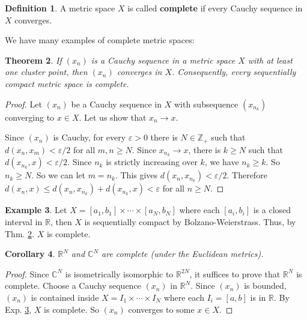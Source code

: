 \documentclass[12pt,b5paper,notitlepage]{article}
\theoremstyle{definition}
\newtheorem{df}{Definition}[section]
\newtheorem{eg}[df]{Example}
\theoremstyle{plain}
\newtheorem{thm}[df]{Theorem}
\newtheorem{co}[df]{Corollary}
\newcommand{\Cbb}{\mathbb C}
\newcommand{\Zbb}{\mathbb Z}
\newcommand{\Rbb}{\mathbb R}
\newcommand{\eps}{\varepsilon}
\numberwithin{equation}{section}
\begin{document}
\begin{df}
A metric space $X$ is called \textbf{complete}  if every Cauchy sequence in $X$ converges.
\end{df}




We have many examples of complete metric spaces:

\begin{thm}\label{lb79}
If $(x_n)$ is a Cauchy sequence in a metric space $X$ with at least one cluster point, then $(x_n)$ converges in $X$. Consequently, every sequentially compact metric space is complete.
\end{thm}

\begin{proof}
Let $(x_n)$ be a Cauchy sequence in $X$ with subsequence $(x_{n_k})$ converging to $x\in X$. Let us show that $x_n\rightarrow x$. 

Since $(x_n)$ is Cauchy, for every $\eps>0$ there is $N\in\Zbb_+$ such that $d(x_n,x_m)<\eps/2$ for all $m,n\geq N$. Since $x_{n_k}\rightarrow x$, there is $k\geq N$ such that $d(x_{n_k},x)<\eps/2$. Since $n_k$ is strictly increasing over $k$, we have $n_k\geq k$. So $n_k\geq N$. So we can let $m=n_k$. This gives $d(x_n,x_{n_k})<\eps/2$. Therefore $d(x_n,x)\leq d(x_n,x_{n_k})+d(x_{n_k},x)<\eps$ for all $n\geq N$.
\end{proof}

\begin{eg}\label{lb84}
Let  $X=[a_1,b_1]\times\cdots\times [a_N,b_N]$  where each $[a_i,b_i]$ is a closed interval in $\Rbb$, then $X$ is  sequentially compact by Bolzano-Weierstrass. Thus, by Thm. \ref{lb79}. $X$ is complete.
\end{eg}


\begin{co}\label{lb80}
$\Rbb^N$ and $\Cbb^N$ are complete (under the Euclidean metrics).
\end{co}

\begin{proof}
Since $\Cbb^N$ is isometrically isomorphic to $\Rbb^{2N}$, it suffices to prove that $\Rbb^N$ is complete. Choose a Cauchy sequence $(x_n)$ in $\Rbb^N$. Since $(x_n)$ is bounded, $(x_n)$ is contained inside $X=I_1\times\cdots\times I_N$ where each $I_i=[a,b]$ is in $\Rbb$. By Exp. \ref{lb84}, $X$ is complete. So $(x_n)$ converges to some $x\in X$.
\end{proof}
\end{document}
